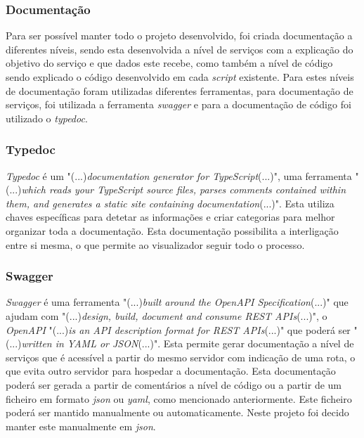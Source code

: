 \subsubsection{Documentação}
Para ser possível manter todo o projeto desenvolvido, foi criada documentação a diferentes níveis, sendo esta desenvolvida a nível de serviços com a explicação do objetivo do serviço e que dados este recebe, como também a nível de código sendo explicado o código desenvolvido em cada \textit{script} existente. Para estes níveis de documentação foram utilizadas diferentes ferramentas, para documentação de serviços, foi utilizada a ferramenta \textit{swagger} e para a documentação de código foi utilizado o \textit{typedoc}.

\subsubsection{Typedoc}

\textit{Typedoc} é um "(...)\emph{documentation generator for TypeScript}(...)"\citep{typedoc}, uma ferramenta "(...)\emph{which reads your TypeScript source files, parses comments contained within them, and generates a static site containing documentation}(...)"\citep{typedoc}. Esta utiliza chaves específicas para detetar as informações e criar categorias para melhor organizar toda a documentação. Esta documentação possibilita a interligação entre si mesma, o que permite ao visualizador seguir todo o processo.

\newpage

\subsubsection{Swagger}

\textit{Swagger} é uma ferramenta "(...)\emph{built around the OpenAPI Specification}(...)"\citep{swagger} que ajudam com "(...)\emph{design, build, document and consume REST APIs}(...)"\citep{swagger}, o \emph{OpenAPI} "(...)\emph{is an API description format for REST APIs}(...)"\citep{swagger} que poderá ser "(...)\emph{written in YAML or JSON}(...)"\citep{swagger}. Esta permite gerar documentação a nível de serviços que é acessível a partir do mesmo servidor com indicação de uma rota, o que evita outro servidor para hospedar a documentação. Esta documentação poderá ser gerada a partir de comentários a nível de código ou a partir de um ficheiro em formato \textit{json} ou \textit{yaml}, como mencionado anteriormente. Este ficheiro poderá ser mantido manualmente ou automaticamente. Neste projeto foi decido manter este manualmente em \emph{json}.